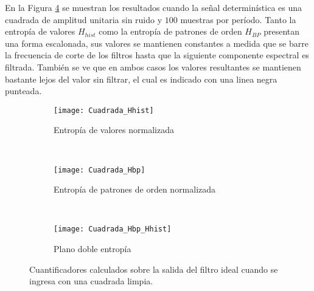 En la Figura \ref{fig:Cuadrada} se muestran los resultados cuando la señal determinística es una cuadrada de amplitud unitaria sin ruido y $100$ muestras por período.
Tanto la entropía de valores $H_{hist}$ como la entropía de patrones de orden $H_{BP}$ presentan una forma escalonada, sus valores se mantienen constantes a medida que se barre la frecuencia de corte de los filtros hasta que la siguiente componente espectral es filtrada.
También se ve que en ambos casos los valores resultantes se mantienen bastante lejos del valor sin filtrar, el cual es indicado con una linea negra punteada.
%
\begin{figure}[h]
    \centering
    \begin{subfigure}[t]{.49\textwidth}
        \texttt{[image: Cuadrada\_Hhist]}
        \caption{Entropía de valores normalizada}
        \label{subfig:Cuadrada_Hhist}
    \end{subfigure}
    ~ %
    \begin{subfigure}[t]{.49\textwidth}
        \texttt{[image: Cuadrada\_Hbp]}
        \caption{Entropía de patrones de orden normalizada}
        \label{subfig:Cuadrada_Hbp}
    \end{subfigure}
    ~ %
    \begin{subfigure}[t]{.49\textwidth}
        \texttt{[image: Cuadrada\_Hbp\_Hhist]}
        \caption{Plano doble entropía}
        \label{subfig:Cuadrada_HbpHhist}
    \end{subfigure}
    \caption{Cuantificadores calculados sobre la salida del filtro ideal cuando se ingresa con una cuadrada limpia.}\label{fig:Cuadrada}
\end{figure}

